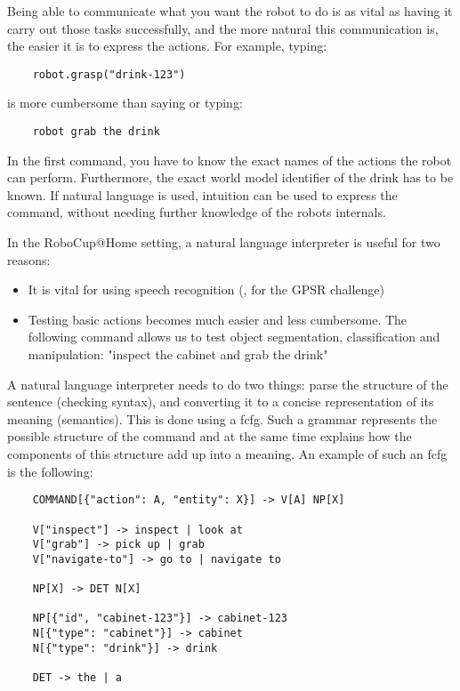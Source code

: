 Being able to communicate what you want the robot to do is as vital as having it carry out those tasks successfully, and the more natural this communication is, the easier it is to express the actions. For example, typing:

\begin{lstlisting}
    robot.grasp("drink-123")
\end{lstlisting}

is more cumbersome than saying or typing:

\begin{lstlisting}
    robot grab the drink
\end{lstlisting}

In the first command, you have to know the exact names of the actions the robot can perform. Furthermore, the exact world model identifier of the drink has to be known. If natural language is used, intuition can be used to express the command, without needing further knowledge of the robots internals.

In the RoboCup@Home setting, a natural language interpreter is useful for two reasons:

\begin{itemize}
    \item It is vital for using speech recognition (\eg, for the GPSR challenge)
    \item Testing basic actions becomes much easier and less cumbersome. The following command allows us to test object segmentation, classification and manipulation: "inspect the cabinet and grab the drink"
\end{itemize}


A natural language interpreter needs to do two things: parse the structure of the sentence (checking syntax), and converting it to a concise representation of its meaning (semantics). This is done using a \gls{fcfg}. Such a grammar represents the possible structure of the command and at the same time explains how the components of this structure add up into a meaning. An example of such an \gls{fcfg} is the following:

\begin{lstlisting}
    COMMAND[{"action": A, "entity": X}] -> V[A] NP[X]

    V["inspect"] -> inspect | look at
    V["grab"] -> pick up | grab       
    V["navigate-to"] -> go to | navigate to

    NP[X] -> DET N[X]

    NP[{"id", "cabinet-123"}] -> cabinet-123
    N[{"type": "cabinet"}] -> cabinet
    N[{"type": "drink"}] -> drink

    DET -> the | a
\end{lstlisting}

